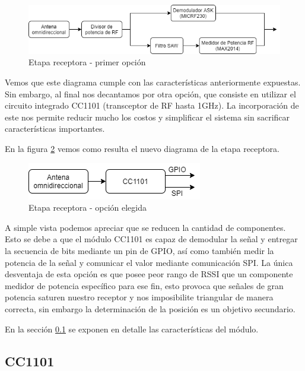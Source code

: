 \begin{figure}[htb]
	\centering
	\includegraphics[scale=0.6]{images/Opcion1.png}
    \caption{Etapa receptora - primer opción}
	\label{EtapaReceptora1}
\end{figure}


Vemos que este diagrama cumple con las características anteriormente expuestas. Sin embargo, al final nos decantamos por otra opción, 
que consiste en utilizar el circuito integrado CC1101 (transceptor de RF hasta 1GHz). La incorporación de este nos permite reducir mucho los costos y simplificar
el sistema sin sacrificar características importantes. \par
En la figura \ref{EtapaReceptora2} vemos como resulta el nuevo diagrama de la etapa receptora. \par

\begin{figure}[htb]
	\centering
	\includegraphics[scale=0.6]{images/Opcion2.png}
    \caption{Etapa receptora - opción elegida}
	\label{EtapaReceptora2}
\end{figure}

A simple vista podemos apreciar que se reducen la cantidad de componentes. Esto se debe a que el módulo CC1101 es capaz de demodular la señal y
entregar la secuencia de bits mediante un pin de GPIO, así como también medir la potencia de la señal y comunicar el valor mediante comunicación SPI.
La única desventaja de esta opción es que posee peor rango de RSSI que un componente medidor de potencia específico para ese fin,
esto provoca que señales de gran potencia saturen nuestro receptor y nos imposibilite triangular de manera correcta, sin embargo la determinación 
de la posición es un objetivo secundario. \par
En la sección \ref{cap:cc1101} se exponen en detalle las características del módulo.\par

\subsection{CC1101} \label{cap:cc1101}
